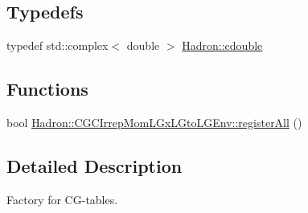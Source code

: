 \subsection*{Typedefs}
\begin{DoxyCompactItemize}
\item 
typedef std\+::complex$<$ double $>$ \mbox{\hyperlink{namespaceHadron_abaab2f90393b8dd8d93060e6ce6568e7}{Hadron\+::cdouble}}
\end{DoxyCompactItemize}
\subsection*{Functions}
\begin{DoxyCompactItemize}
\item 
bool \mbox{\hyperlink{namespaceHadron_1_1CGCIrrepMomLGxLGtoLGEnv_ab765f2f3a5f090ad99642c37e973a15d}{Hadron\+::\+C\+G\+C\+Irrep\+Mom\+L\+Gx\+L\+Gto\+L\+G\+Env\+::register\+All}} ()
\end{DoxyCompactItemize}


\subsection{Detailed Description}
Factory for C\+G-\/tables. 

